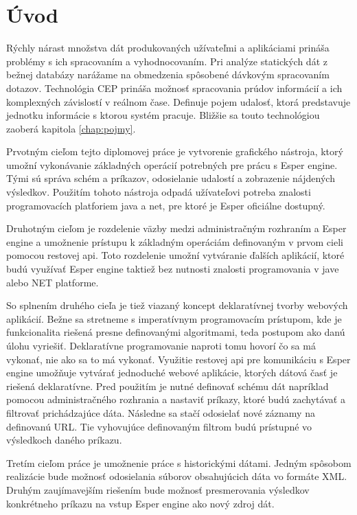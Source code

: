 \chapter*{Úvod}

Rýchly nárast množstva dát produkovaných užívateľmi a aplikáciami prináša problémy s ich spracovaním a vyhodnocovaním. Pri analýze statických dát z bežnej databázy narážame na obmedzenia spôsobené dávkovým spracovaním dotazov. Technológia \ac{CEP} prináša možnosť spracovania prúdov informácií a ich komplexných závislostí v reálnom čase. Definuje pojem udalosť, ktorá predstavuje jednotku informácie s ktorou systém pracuje. Bližšie sa touto technológiou zaoberá kapitola \ref{chap:pojmy}.

Prvotným cieľom tejto diplomovej práce je vytvorenie grafického nástroja, ktorý umožní vykonávanie základných operácií potrebných pre prácu s Esper engine. Tými sú správa schém a príkazov, odosielanie udalostí a zobrazenie nájdených výsledkov. Použitím tohoto nástroja odpadá užívateľovi potreba znalosti programovacích platforiem java a net, pre ktoré je Esper oficiálne dostupný.

Druhotným cieľom je rozdelenie väzby medzi administračným rozhraním a Esper engine a umožnenie prístupu k základným operáciám definovaným v prvom cieli pomocou restovej api. Toto rozdelenie umožní vytváranie ďalších aplikácií, ktoré budú využívať Esper engine taktiež bez nutnosti znalosti programovania v jave alebo NET platforme.

So splnením druhého cieľa je tiež viazaný koncept deklaratívnej tvorby webových aplikácií. Bežne sa stretneme s imperatívnym programovacím prístupom, kde je funkcionalita riešená presne definovanými algoritmami, teda postupom ako danú úlohu vyriešiť. Deklaratívne programovanie naproti tomu hovorí čo sa má vykonať, nie ako sa to má vykonať.
Využitie restovej api pre komunikáciu s Esper engine umožňuje vytvárať jednoduché webové aplikácie, ktorých dátová časť je riešená deklaratívne. Pred použitím je nutné definovať schému dát napríklad pomocou administračného rozhrania a nastaviť príkazy, ktoré budú zachytávať a filtrovať prichádzajúce dáta. Následne sa stačí odosielať nové záznamy na definovanú URL. Tie vyhovujúce definovaným filtrom budú prístupné vo výsledkoch daného príkazu.

Tretím cieľom práce je umožnenie práce s historickými dátami. Jedným spôsobom realizácie bude možnosť odosielania súborov obsahujúcich dáta vo formáte XML. Druhým zaujímavejším riešením bude možnosť presmerovania výsledkov konkrétneho príkazu na vstup Esper engine ako nový zdroj dát.


